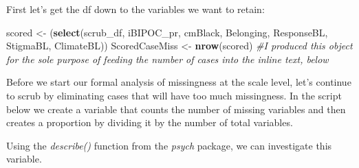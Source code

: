 \documentclass[
  11pt,
]{book}
\newenvironment{Shaded}{\begin{snugshade}}{\end{snugshade}}
\newcommand{\AttributeTok}[1]{\textcolor[rgb]{0.27,0.27,0.27}{#1}}
\newcommand{\CommentTok}[1]{\textcolor[rgb]{0.37,0.37,0.37}{\textit{#1}}}
\newcommand{\DecValTok}[1]{\textcolor[rgb]{0.06,0.06,0.06}{#1}}
\newcommand{\FunctionTok}[1]{\textcolor[rgb]{0.27,0.27,0.27}{\textbf{#1}}}
\newcommand{\NormalTok}[1]{#1}
\newcommand{\OtherTok}[1]{\textcolor[rgb]{0.37,0.37,0.37}{#1}}
\newcommand{\SpecialCharTok}[1]{\textcolor[rgb]{0.43,0.43,0.43}{\textbf{#1}}}
\begin{document}
First let's get the df down to the variables we want to retain:

\begin{Shaded}
\begin{Highlighting}[]
\NormalTok{scored }\OtherTok{\textless{}{-}}\NormalTok{ (}\FunctionTok{select}\NormalTok{(scrub\_df, iBIPOC\_pr, cmBlack, Belonging, ResponseBL,}
\NormalTok{    StigmaBL, ClimateBL))}
\NormalTok{ScoredCaseMiss }\OtherTok{\textless{}{-}} \FunctionTok{nrow}\NormalTok{(scored)  }\CommentTok{\#I produced this object for the sole purpose of feeding the number of cases into the inline text, below}
\end{Highlighting}
\end{Shaded}

Before we start our formal analysis of missingness at the scale level, let's continue to scrub by eliminating cases that will have too much missingness. In the script below we create a variable that counts the number of missing variables and then creates a proportion by dividing it by the number of total variables.

Using the \emph{describe()} function from the \emph{psych} package, we can investigate this variable.

\begin{Shaded}
\end{Shaded}
\end{document}
